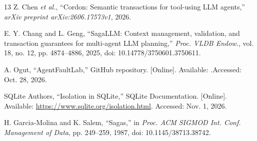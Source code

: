 \documentclass[conference,10pt]{IEEEtran}
\begin{document}
\begin{thebibliography}{13}
Z. Chen \emph{et al.}, ``Cordon: Semantic transactions for tool\hyp{}using LLM agents,'' \emph{arXiv preprint arXiv:2606.17573v1}, 2026.

E. Y. Chang and L. Geng, ``SagaLLM: Context management, validation, and transaction guarantees for multi\hyp{}agent LLM planning,'' \emph{Proc. VLDB Endow.}, vol. 18, no. 12, pp. 4874--4886, 2025, doi: 10.14778/3750601.3750611.

A. Ogut, ``AgentFaultLab,'' GitHub repository. [Online]. Available: .\newline Accessed: Oct. 28, 2026.

SQLite Authors, ``Isolation in SQLite,'' SQLite Documentation. [Online]. Available: \url{https://www.sqlite.org/isolation.html}. Accessed: Nov. 1, 2026.

H. Garcia\hyp{}Molina and K. Salem, ``Sagas,'' in \emph{Proc. ACM SIGMOD Int. Conf. Management of Data}, pp. 249--259, 1987, doi: 10.1145/38713.38742.

\end{thebibliography}
\end{document}
